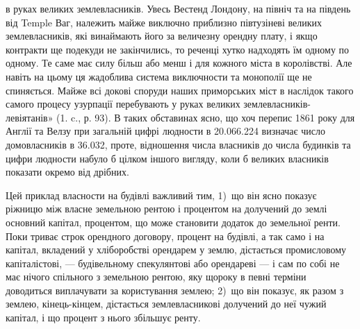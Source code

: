 \parcont{}  %
в руках великих землевласників. Увесь Вестенд Лондону, на північ та на південь
від Temple Ваг, належить майже виключно приблизно півтузіневі великих
землевласників, які винаймають його за величезну орендну плату, і якщо
контракти ще подекуди не закінчились, то реченці хутко надходять їм одному по
одному. Те саме має силу більш або менш і для кожного міста в королівстві. Але
навіть на цьому ця жадоблива система виключности та монополії ще не спиняється. Майже всі докові
споруди наших приморських міст в наслідок такого
самого процесу узурпації перебувають у руках великих землевласників-левіятанів» (1. c., р. 93). В
таких обставинах ясно, що хоч перепис 1861 року для
Англії та Велзу при загальній цифрі людности в \num{20.066.224} визначає число
домовласників в \num{36.032}, проте, відношення числа власників до числа будинків
та цифри людности набуло б цілком іншого вигляду, коли б великих власників
показати окремо від дрібних.

Цей приклад власности на будівлі важливий тим, 1)~що він ясно показує
ріжницю між власне земельною рентою і процентом на долучений до землі
основний капітал, процентом, що може становити додаток до земельної ренти.
Поки триває строк орендного договору, процент на будівлі, а так само і на
капітал, вкладений у хліборобстві орендарем у землю, дістається промисловому капіталістові, —
будівельному спекулянтові або орендареві — і сам по собі
не має нічого спільного з земельною рентою, яку щороку в певні терміни доводиться виплачувати за
користування землею; 2)~що він показує, як разом з
землею, кінець-кінцем, дістається землевласникові долучений до неї чужий капітал, і що процент з
нього збільшує ренту.

